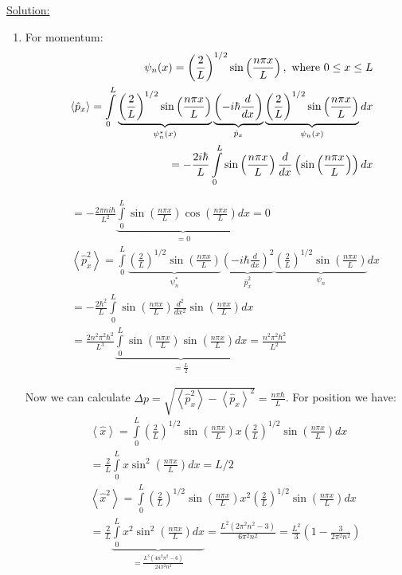 \noindent
\underline{Solution:}\\
\begin{enumerate}
\item For momentum:
\begin{eqnarray}
\nonumber
& & \psi_n(x) = \left(\frac{2}{L}\right)^{1/2}\sin\left(\frac{n\pi x}{L}\right),\textnormal{ where }0\le x\le L\\
\nonumber
& & \left<\hat{p}_x\right> = \int\limits_0^L\underbrace{\left(\frac{2}{L}\right)^{1/2}\sin\left(\frac{n\pi x}{L}\right)}_{\psi_n^*(x)}
\underbrace{\left(-i\hbar\frac{d}{dx}\right)}_{\hat{p}_x}\underbrace{\left(\frac{2}{L}\right)^{1/2}\sin\left(\frac{n\pi x}{L}\right)}_{\psi_n(x)}dx\\
\nonumber
& & = -\frac{2i\hbar}{L}\int\limits_0^L\sin\left(\frac{n\pi x}{L}\right)\frac{d}{dx}\left(\sin\left(\frac{n\pi x}{L}\right)\right)dx
\end{eqnarray}

\begin{eqnarray}
\nonumber
& & = -\frac{2\pi ni\hbar}{L^2}\underbrace{\int\limits_0^L\sin\left(\frac{n\pi x}{L}\right)\cos\left(\frac{n\pi x}{L}\right)dx}_{= 0} = 0\\
\nonumber
& & \left<\hat{p}_x^2\right> = \int\limits_0^L\underbrace{\left(\frac{2}{L}\right)^{1/2}\sin\left(\frac{n\pi x}{L}\right)}_{\psi^*_n}
\underbrace{\left(-i\hbar\frac{d}{dx}\right)^2}_{\hat{p}_x^2}\underbrace{\left(\frac{2}{L}\right)^{1/2}\sin\left(\frac{n\pi x}{L}\right)}_{\psi_n}dx\\
\nonumber
& & = -\frac{2\hbar^2}{L}\int\limits_0^L\sin\left(\frac{n\pi x}{L}\right)\frac{d^2}{dx^2}\sin\left(\frac{n\pi x}{L}\right)dx\\
\nonumber
& & = \frac{2n^2\pi^2\hbar^2}{L^3}\underbrace{\int\limits_0^L\sin\left(\frac{n\pi x}{L}\right)\sin\left(\frac{n\pi x}{L}\right)dx}_{=\frac{L}{2}} = \frac{n^2\pi^2\hbar^2}{L^2}
\end{eqnarray}

Now we can calculate $\Delta p = \sqrt{\left<\hat{p}_x^2\right> - \left<\hat{p}_x\right>^2} = \frac{n\pi\hbar}{L}$. For position we have:
\begin{eqnarray}
\nonumber
& & \left<\hat{x}\right> = \int\limits_0^L\left(\frac{2}{L}\right)^{1/2}\sin\left(\frac{n\pi x}{L}\right)x\left(\frac{2}{L}\right)^{1/2}\sin\left(\frac{n\pi x}{L}\right)dx\\
\nonumber
& & = \frac{2}{L}\int\limits_0^Lx\sin^2\left(\frac{n\pi x}{L}\right)dx = L/2\\
\nonumber
& & \left<\hat{x}^2\right> = \int\limits_0^L\left(\frac{2}{L}\right)^{1/2}\sin\left(\frac{n\pi x}{L}\right)x^2\left(\frac{2}{L}\right)^{1/2}\sin\left(\frac{n\pi x}{L}\right)dx\\
\nonumber
& & = \frac{2}{L}\underbrace{\int\limits_0^Lx^2\sin^2\left(\frac{n\pi x}{L}\right)dx}_{=\frac{L^3(4n^2\pi^2 - 6)}{24\pi^2n^2}} = \frac{L^2(2\pi^2n^2 - 3)}{6\pi^2n^2} = \frac{L^2}{3}\left(1 - \frac{3}{2\pi^2n^2}\right)
\end{eqnarray}


\end{enumerate}
